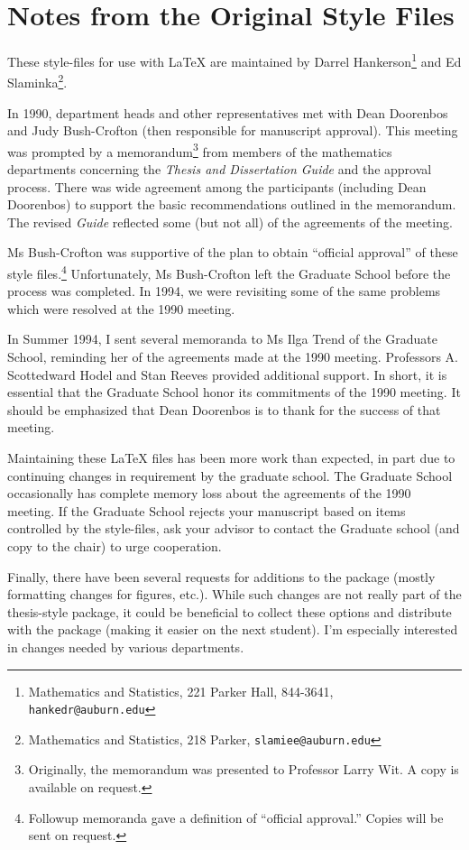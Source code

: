 \chapter{Notes from the Original Style Files\label{appendix_notes}}

These style-files for use with \LaTeX{} are maintained by Darrel
Hankerson\footnote{Mathematics and Statistics, 221 Parker Hall,
844-3641, {\tt hankedr@auburn.edu}} and Ed
Slaminka\footnote{Mathematics and Statistics, 218 Parker,
{\tt slamiee@auburn.edu}}. 

In 1990, department heads and other representatives met with Dean Doorenbos
and Judy Bush-Crofton (then responsible for manuscript approval). This
meeting was prompted by a memorandum\footnote{Originally, the memorandum
was presented to Professor Larry Wit. A copy is available on request.} from
members of the mathematics departments concerning the {\em Thesis and
Dissertation Guide\/} and the approval process. There was wide agreement
among the participants (including Dean Doorenbos) to support the basic
recommendations outlined in the memorandum. The revised {\em Guide\/}
reflected some (but not all) of the agreements of the meeting.

Ms Bush-Crofton was supportive of the plan to obtain ``official approval''
of these style files.\footnote{Followup memoranda gave a definition of
``official approval.'' Copies will be sent on request.}  Unfortunately, Ms
Bush-Crofton left the Graduate School before the process was completed. In
1994, we were revisiting some of the same problems which were
resolved at the 1990 meeting.

In Summer 1994, I sent several memoranda to Ms Ilga Trend of the Graduate
School, reminding her of the agreements made at the 1990 meeting.
Professors A. Scottedward Hodel and Stan Reeves provided additional
support.  In short, it is essential that the Graduate School honor its
commitments of the 1990 meeting. It should be emphasized that Dean
Doorenbos is to thank for the success of that meeting.

Maintaining these \LaTeX{} files has been more work than expected, in
part due to continuing changes in requirement by the graduate school.
The Graduate School occasionally has complete memory loss about the
agreements of the 1990 meeting. If the Graduate School rejects your
manuscript based on items controlled by the style-files, ask
your advisor to contact the Graduate school (and copy to the chair) to urge
cooperation.

Finally, there have been several requests for additions to the package
(mostly formatting changes for figures, etc.). While such changes are not
really part of the thesis-style package, it could be beneficial to collect
these options and distribute with the package (making it easier on the next
student).  I'm especially interested in changes needed by various
departments.



